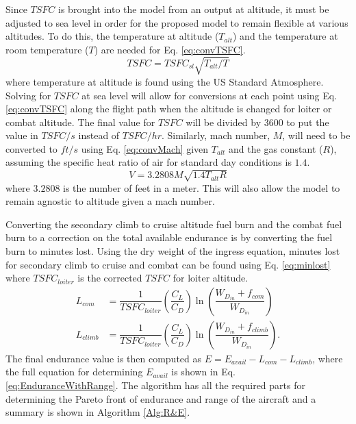 Since $TSFC$ is brought into the model from an output at altitude, it must be adjusted to sea level in order for the proposed model to remain flexible at various altitudes. To do this, the temperature at altitude ($T_{alt}$) and the temperature at room temperature ($T$) are needed for Eq. \ref{eq:convTSFC}.
\begin{equation}
    TSFC = TSFC_{sl}\sqrt{T_{alt}/T}
    \label{eq:convTSFC}
\end{equation}
where temperature at altitude is found using the US Standard Atmosphere.
Solving for $TSFC$ at sea level will allow for conversions at each point  using Eq. \ref{eq:convTSFC} along the flight path when the altitude is changed for loiter or combat altitude. The final value for $TSFC$ will be divided by $3600$ to put the value in $TSFC/s$ instead of $TSFC/hr$. Similarly, mach number, $M$, will need to be converted to $ft/s$ using Eq. \ref{eq:convMach} given $T_{alt}$ and the gas constant ($R$), assuming the specific heat ratio of air for standard day conditions is $1.4$.
\begin{equation}
    V = 3.2808M\sqrt{1.4T_{alt}R}
    \label{eq:convMach}
\end{equation}
where $3.2808$ is the number of feet in a meter. This will also allow the model to remain agnostic to altitude given a mach number.\par
Converting the secondary climb to cruise altitude fuel burn and the combat fuel burn to a correction on the total available endurance is by converting the fuel burn to minutes lost. Using the dry weight of the ingress equation, minutes lost for secondary climb to cruise and combat can be found using Eq. \ref{eq:minlost} where $TSFC_{loiter}$ is the corrected $TSFC$ for loiter altitude.
\begin{equation}
\label{eq:minlost}
\begin{aligned}
    L_{com} &= \dfrac{1}{TSFC_{loiter}}\left(\dfrac{C_L}{C_D}\right)\ln\left(\dfrac{W_{D_{in}}+f_{com}}{W_{D_{in}}}\right)\\
    L_{climb} &=\dfrac{1}{TSFC_{loiter}}\left(\dfrac{C_L}{C_D}\right)\ln\left(\dfrac{W_{D_{in}}+f_{climb}}{W_{D_{in}}}\right).
\end{aligned}
\end{equation}
The final endurance value is then computed as $E = E_{avail}-L_{com}-L_{climb}$, where the full equation for determining $E_{avail}$ is shown in Eq. \ref{eq:EnduranceWithRange}. The algorithm has all the required parts for determining the Pareto front of endurance and range of the aircraft and a summary is shown in Algorithm \ref{Alg:R&E}. 
